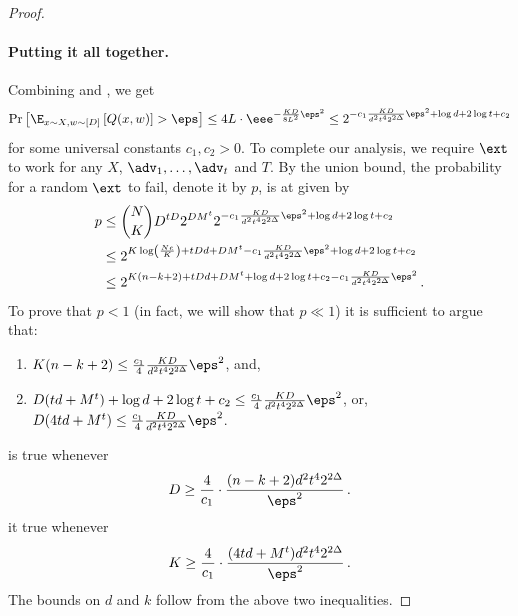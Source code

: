 \begin{proof}
\paragraph*{Putting it all together.}   %
Combining  and , we get
\[
\Pr\left[\E_{x \sim X,w \sim [D]}\left[ Q(x,w) \right] > \eps\right] \le 4L \cdot
\eee^{-\frac{KD}{8L^2}\eps^2}
\le 2^{-c_{1}\frac{KD}{d^{2}t^{4}2^{2\Delta}}\eps^{2}+\log d + 2\log t + c_2}
\]
for some universal constants $c_1,c_2 > 0$. To complete our analysis, we require $\ext$
to work for any $X$, $\adv_1,\ldots,\adv_t$ and $T$. By the union bound, the probability
for a random $\ext$ to fail, denote it by $p$, is at given by
\begin{align*}
p &\le \binom{N}{K}D^{tD}2^{DM^t}2^{-c_{1}\frac{KD}{d^{2}t^{4}2^{2\Delta}}\eps^{2}+\log d + 2\log t + c_2} \\
&\le 2^{K\log\left( \frac{Ne}{K} \right) + tDd + DM^t - c_{1}\frac{KD}{d^{2}t^{4}2^{2\Delta}}\eps^{2}+\log d + 2\log t + c_2} \\
&\le 2^{K(n-k+2)+tDd+DM^t +\log d +2\log t + c_2 - c_{1}\frac{KD}{d^{2}t^{4}2^{2\Delta}}\eps^{2}}\,.
\end{align*}
To prove that $p < 1$ (in fact, we will show that $p \ll 1$) it is sufficient to argue that:
\begin{enumerate}
\item\label{eq:prob1}  $K(n-k+2) \le \frac{c_1}{4}\frac{KD}{d^{2}t^{4}2^{2\Delta}}\eps^{2}$, and,
\item\label{eq:prob2}  $D(td+M^t) +\log d +2\log t + c_2  \le \frac{c_1}{4}\frac{KD}{d^{2}t^{4}2^{2\Delta}}\eps^{2}$, or, $D(4td+M^t) \le \frac{c_1}{4}\frac{KD}{d^{2}t^{4}2^{2\Delta}}\eps^{2}$.
\end{enumerate}
 is true whenever 
\[
D \ge \frac{4}{c_1} \cdot \frac{(n-k+2)d^{2}t^{4}2^{2\Delta}}{\eps^2}\,.
\]
 it true whenever
\[
K \ge \frac{4}{c_1} \cdot \frac{(4td+M^t)d^{2}t^{4}2^{2\Delta}}{\eps^2}\,.
\]
The bounds on $d$ and $k$ follow from the above two inequalities.
\end{proof}





